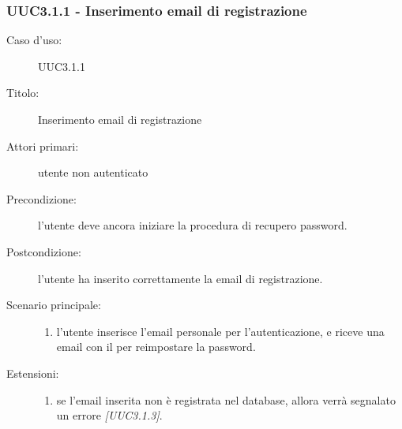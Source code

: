 \documentclass[casi-duso]{subfiles}
\begin{document}
\subsubsection{UUC3.1.1 - Inserimento email di registrazione}%
\label{subsub:UUC3.1.1utente}
\begin{description}
  \item[Caso d’uso:] UUC3.1.1
  \item[Titolo:] Inserimento email di registrazione
  \item[Attori primari:] utente non autenticato
  \item[Precondizione:] l'utente deve ancora iniziare la procedura di recupero password.
  \item[Postcondizione:] l'utente ha inserito correttamente la email di registrazione.
  \item[Scenario principale:]
        \begin{enumerate}
          \item l'utente inserisce l'email personale per l'autenticazione, e riceve una email con il  per reimpostare la password.
        \end{enumerate}
  \item[Estensioni:]
        \begin{enumerate}
          \item se l'email inserita non è registrata nel database, allora verrà segnalato un errore \emph{[UUC3.1.3]}.
        \end{enumerate}
\end{description}

\end{document}
